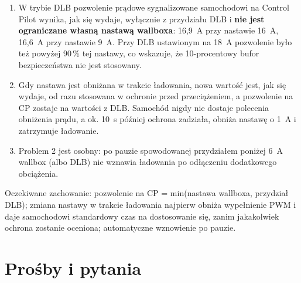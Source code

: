 \documentclass[11pt,a4paper]{article}
\begin{document}
\begin{enumerate}
\item W trybie DLB pozwolenie prądowe sygnalizowane samochodowi na Control Pilot wynika, jak się wydaje, wyłącznie z przydziału DLB i \textbf{nie jest ograniczane własną nastawą wallboxa}: 16,9~A przy nastawie 16~A, 16,6~A przy nastawie 9~A. Przy DLB ustawionym na 18~A pozwolenie było też powyżej 90\,\% tej nastawy, co wskazuje, że 10-procentowy bufor bezpieczeństwa nie jest stosowany.
\item Gdy nastawa jest obniżana w trakcie ładowania, nowa wartość jest, jak się wydaje, od razu stosowana w ochronie przed przeciążeniem, a pozwolenie na CP zostaje na wartości z DLB. Samochód nigdy nie dostaje polecenia obniżenia prądu, a ok. 10~s później ochrona zadziała, obniża nastawę o 1~A i zatrzymuje ładowanie.
\item Problem 2 jest osobny: po pauzie spowodowanej przydziałem poniżej 6~A wallbox (albo DLB) nie wznawia ładowania po odłączeniu dodatkowego obciążenia.
\end{enumerate}

Oczekiwane zachowanie: pozwolenie na CP = min(nastawa wallboxa, przydział DLB); zmiana nastawy w trakcie ładowania najpierw obniża wypełnienie PWM i daje samochodowi standardowy czas na dostosowanie się, zanim jakakolwiek ochrona zostanie oceniona; automatyczne wznowienie po pauzie.

\section{Prośby i pytania}
\end{document}
